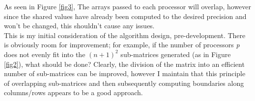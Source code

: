 \documentclass{article}
\begin{document}
As seen in Figure \ref{fig3}, The arrays passed to each processor will overlap, however since the shared values have already been computed to the desired precision and won't be changed, this shouldn't cause any issues. \\
This is my initial consideration of the algorithm design, pre-development. There is obviously room for improvement; for example, if the number of processors \textit{p} does not evenly fit into the $(n+1)^2$ sub-matrices generated (as in Figure \ref{fig2}), what should be done? Clearly, the division of the matrix into an efficient number of sub-matrices can be improved, however I maintain that this principle of overlapping sub-matrices and then subsequently computing boundaries along columns/rows appears to be a good approach.
\end{document}
